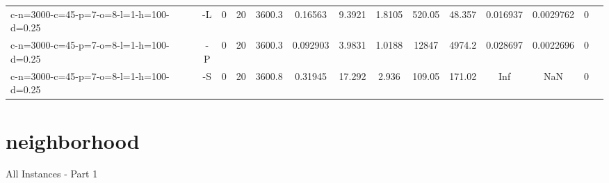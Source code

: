 \documentclass[landscape, a4paper]{article}
\begin{document}
\begin{center}
\begin{tabular}{lccccccccccccc}
c-n=3000-c=45-p=7-o=8-l=1-h=100-d=0.25 & -L & 0 & 20 & 3600.3 & 0.16563 & 9.3921 & 1.8105 & 520.05 & 48.357 & 0.016937 & 0.0029762 & 0 & \\
c-n=3000-c=45-p=7-o=8-l=1-h=100-d=0.25 & -P & 0 & 20 & 3600.3 & 0.092903 & 3.9831 & 1.0188 & 12847 & 4974.2 & 0.028697 & 0.0022696 & 0 & \\
c-n=3000-c=45-p=7-o=8-l=1-h=100-d=0.25 & -S & 0 & 20 & 3600.8 & 0.31945 & 17.292 & 2.936 & 109.05 & 171.02 & Inf & NaN & 0 & \\
\end{tabular}
\end{center}

\section{neighborhood}
\begin{center}
All Instances - Part 1


\end{center}
\end{document}
